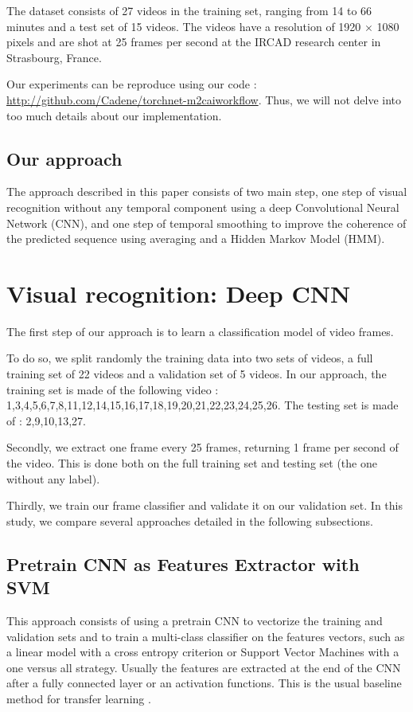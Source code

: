 \documentclass[10pt,twocolumn,letterpaper]{article}
\begin{document}
The dataset consists of 27 videos in the training set, ranging from 14 to 66
minutes and a test set of 15 videos. The videos have a resolution of 1920 $\times$
1080 pixels and are shot at 25 frames per second at the IRCAD research center in
Strasbourg, France.

Our experiments can be reproduce using our code : \url{http://github.com/Cadene/torchnet-m2caiworkflow}. Thus, we will not delve into too much details about our implementation.

\subsection{Our approach}

The approach described in this paper consists of two main step, one step of visual recognition without any temporal component using a deep Convolutional Neural Network (CNN), and one step of temporal smoothing to improve the coherence of the predicted sequence using averaging and a Hidden Markov Model (HMM).

\section{Visual recognition: Deep CNN}

The first step of our approach is to learn a classification model of video frames.

To do so, we split randomly the training data into two sets of videos, a full training set of 22 videos and a validation set of 5 videos. In our approach, the training set is made of the following video : 1,3,4,5,6,7,8,11,12,14,15,16,17,18,19,20,21,22,23,24,25,26. The testing set is made of : 2,9,10,13,27.

Secondly, we extract one frame every 25 frames, returning 1 frame per second of the video. This is done both on the full training set and testing set (the one without any label).

Thirdly, we train our frame classifier and validate it on our validation set. In this study, we compare several approaches detailed in the following subsections.

\subsection{Pretrain CNN as Features Extractor with SVM}

This approach consists of using a pretrain CNN to vectorize the training and validation sets and to train a multi-class classifier on the features vectors, such as a linear model with a cross entropy criterion or Support Vector Machines with a one versus all strategy.
Usually the features are extracted at the end of the CNN after a fully connected layer or an activation functions. This is the usual baseline method for transfer learning \cite{simonyan2014very}.
\end{document}
